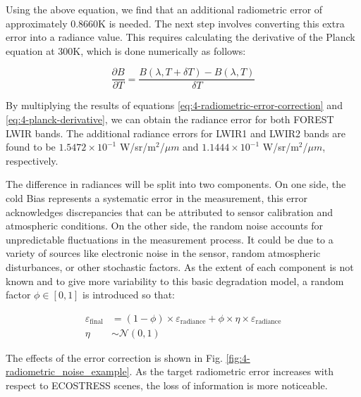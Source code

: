         Using the above equation, we find that an additional radiometric error of approximately 0.8660K is needed. The next step involves converting this extra error into a radiance value. This requires calculating the derivative of the Planck equation at 300K, which is done numerically as follows:
        
        \begin{equation}
            \frac{\partial B}{\partial T} = \frac{B(\lambda, T + \delta T) - B(\lambda, T)}{\delta T}
            \label{eq:4-planck-derivative}
        \end{equation}  
        
        By multiplying the results of equations \ref{eq:4-radiometric-error-correction} and \ref{eq:4-planck-derivative}, we can obtain the radiance error for both FOREST LWIR bands. The additional radiance errors for LWIR1 and LWIR2 bands are found to be \(1.5472 \times 10^{-1}\) W/sr/m\(^2\)/\(\mu m\) and \(1.1444 \times 10^{-1}\) W/sr/m\(^2\)/\(\mu m\), respectively.

        The difference in radiances will be split into two components. On one side, the cold Bias represents a systematic error in the measurement, this error acknowledges discrepancies that can be attributed to sensor calibration and atmospheric conditions. On the other side, the random noise accounts for unpredictable fluctuations in the measurement process. It could be due to a variety of sources like electronic noise in the sensor, random atmospheric disturbances, or other stochastic factors. As the extent of each component is not known and to give more variability to this basic degradation model, a random factor $\phi \in [0,1] $ is introduced so that:

        \begin{equation}
        \begin{aligned}
            \varepsilon_{\text{final}} &= (1 - \phi) \times \varepsilon_{\text{radiance}} + \phi \times \eta \times \varepsilon_{\text{radiance}} \\
            \eta & \sim \mathcal{N} (0,1)
        \end{aligned}
        \end{equation}    

        The effects of the error correction is shown in Fig. \ref{fig:4-radiometric_noise_example}. As the target radiometric error increases with respect to ECOSTRESS scenes, the loss of information is more noticeable.


